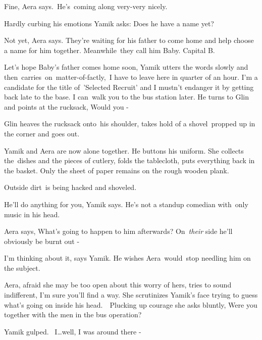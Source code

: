\documentclass[twoside,11pt]{book}
\begin{document}
{\textquotedbl}Fine,{\textquotedbl} Aera says.\  {\textquotedbl}He's\ coming along very{}-very nicely.{\textquotedbl} 

Hardly curbing his emotions Yamik asks: {\textquotedbl}Does he have a name yet?{\textquotedbl} 

{\textquotedbl}Not yet,{\textquotedbl} Aera says. {\textquotedbl}They're waiting for his father to come home and help
choose a name for him together. Meanwhile{\ }they call him Baby. Capital
B.{\textquotedbl}

{\textquotedbl}Let's hope Baby's father comes home soon,{\textquotedbl} Yamik utters the words slowly and
then\ carries\ on\ matter-of{}-factly,\ {\textquotedbl}I have to leave here in quarter of an hour. I'm a candidate for
the title of\ {}'Selected Recruit{}' and I mustn't endanger it by getting back late to the base. I can~walk you to the
bus station later.{\textquotedbl} He turns to Glin and points at the rucksack, {\textquotedbl}Would you
-{\textquotedbl}\ 

Glin heaves the rucksack onto~his shoulder, takes hold of a shovel{\ }propped up
in the corner and goes out.

Yamik and Aera are now alone together. He buttons his uniform. She collects the~dishes and the pieces of cutlery, folds
the tablecloth, puts everything back in the basket. Only the sheet of paper remains on the rough wooden plank. 

Outside dirt{\ }is being hacked and shoveled. 

{\textquotedbl}He'll do anything for you,{\textquotedbl} Yamik says. {\textquotedbl}He's not a standup comedian
with{\ }only music in his head.{\textquotedbl} 

Aera says, {\textquotedbl}What's going to happen to him afterwards? On\ \textit{their} side he'll obviously be burnt out
-{\textquotedbl} 

{\textquotedbl}I'm thinking about it,{\textquotedbl} says Yamik. He wishes
Aera~would{\ }stop needling him on the subject.

Aera, afraid she may be too open about this worry of hers, tries to sound indifferent, {\textquotedbl}I'm sure you'll
find a way.{\textquotedbl} She scrutinizes Yamik's face trying to guess what's going on inside his head.\ \ Plucking up
courage she asks bluntly, {\textquotedbl}Were you together with the men in the bus operation?{\textquotedbl} 

Yamik gulped. {\textquotedbl}\ I{\dots}well, I was around there {}-{\textquotedbl}
\end{document}
